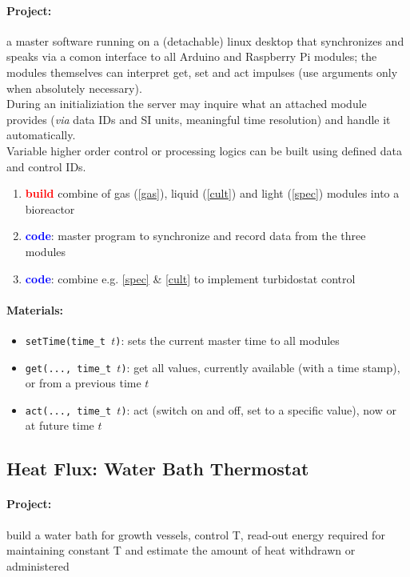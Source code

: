 \documentclass[12pt,a4paper]{scrartcl}
\newcommand{\build}[0]{\textcolor{red}{\textbf{build}}}
\newcommand{\code}[0]{\textcolor{blue}{\textbf{code}}}
\begin{document}
\paragraph{Project:} a master software running on a (detachable) linux 
desktop that synchronizes and speaks via a comon interface to all
Arduino and Raspberry Pi modules; the modules themselves can interpret
get, set and act impulses (use arguments only when absolutely
necessary).\\
During an initializiation the server may inquire what an
attached module provides (\textit{via} data IDs and SI units, meaningful
time resolution) and handle it automatically. \\
Variable higher order control or processing logics can be built
using defined data and control IDs.
\begin{enumerate}
\item \build{} combine of gas (\ref{gas}), liquid (\ref{cult})
  and light (\ref{spec}) modules into a bioreactor
\item \code{}: master program to synchronize and record data from
  the three modules
\item \code{}: combine e.g. \ref{spec} \& \ref{cult} to implement
  turbidostat control
\end{enumerate}


\paragraph{Materials:}
\begin{itemize}
\item \texttt{setTime(time\_t $t$)}: sets the current master time to
  all modules
\item \texttt{get(..., time\_t $t$)}: get all values, currently
  available (with a time stamp), or from a previous time $t$
\item \texttt{act(..., time\_t $t$)}: act (switch on and off, set to a
  specific value), now or at future time $t$
\end{itemize}

\newpage
\subsection{Heat Flux: Water Bath Thermostat}
\label{heat}

\paragraph{Project:} build a water bath for growth vessels, control
T, read-out energy required for maintaining constant T and estimate
the amount of heat withdrawn or administered
\end{document}
